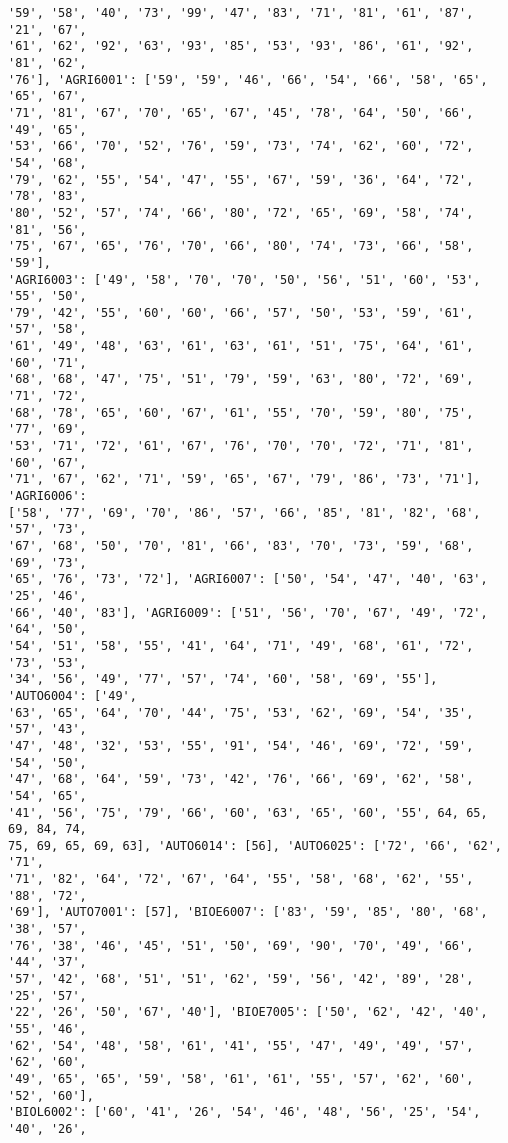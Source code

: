 \documentclass[11pt]{article}
\begin{document}
\begin{Verbatim}[commandchars=\\\{\}]
'59', '58', '40', '73', '99', '47', '83', '71', '81', '61', '87', '21', '67',
'61', '62', '92', '63', '93', '85', '53', '93', '86', '61', '92', '81', '62',
'76'], 'AGRI6001': ['59', '59', '46', '66', '54', '66', '58', '65', '65', '67',
'71', '81', '67', '70', '65', '67', '45', '78', '64', '50', '66', '49', '65',
'53', '66', '70', '52', '76', '59', '73', '74', '62', '60', '72', '54', '68',
'79', '62', '55', '54', '47', '55', '67', '59', '36', '64', '72', '78', '83',
'80', '52', '57', '74', '66', '80', '72', '65', '69', '58', '74', '81', '56',
'75', '67', '65', '76', '70', '66', '80', '74', '73', '66', '58', '59'],
'AGRI6003': ['49', '58', '70', '70', '50', '56', '51', '60', '53', '55', '50',
'79', '42', '55', '60', '60', '66', '57', '50', '53', '59', '61', '57', '58',
'61', '49', '48', '63', '61', '63', '61', '51', '75', '64', '61', '60', '71',
'68', '68', '47', '75', '51', '79', '59', '63', '80', '72', '69', '71', '72',
'68', '78', '65', '60', '67', '61', '55', '70', '59', '80', '75', '77', '69',
'53', '71', '72', '61', '67', '76', '70', '70', '72', '71', '81', '60', '67',
'71', '67', '62', '71', '59', '65', '67', '79', '86', '73', '71'], 'AGRI6006':
['58', '77', '69', '70', '86', '57', '66', '85', '81', '82', '68', '57', '73',
'67', '68', '50', '70', '81', '66', '83', '70', '73', '59', '68', '69', '73',
'65', '76', '73', '72'], 'AGRI6007': ['50', '54', '47', '40', '63', '25', '46',
'66', '40', '83'], 'AGRI6009': ['51', '56', '70', '67', '49', '72', '64', '50',
'54', '51', '58', '55', '41', '64', '71', '49', '68', '61', '72', '73', '53',
'34', '56', '49', '77', '57', '74', '60', '58', '69', '55'], 'AUTO6004': ['49',
'63', '65', '64', '70', '44', '75', '53', '62', '69', '54', '35', '57', '43',
'47', '48', '32', '53', '55', '91', '54', '46', '69', '72', '59', '54', '50',
'47', '68', '64', '59', '73', '42', '76', '66', '69', '62', '58', '54', '65',
'41', '56', '75', '79', '66', '60', '63', '65', '60', '55', 64, 65, 69, 84, 74,
75, 69, 65, 69, 63], 'AUTO6014': [56], 'AUTO6025': ['72', '66', '62', '71',
'71', '82', '64', '72', '67', '64', '55', '58', '68', '62', '55', '88', '72',
'69'], 'AUTO7001': [57], 'BIOE6007': ['83', '59', '85', '80', '68', '38', '57',
'76', '38', '46', '45', '51', '50', '69', '90', '70', '49', '66', '44', '37',
'57', '42', '68', '51', '51', '62', '59', '56', '42', '89', '28', '25', '57',
'22', '26', '50', '67', '40'], 'BIOE7005': ['50', '62', '42', '40', '55', '46',
'62', '54', '48', '58', '61', '41', '55', '47', '49', '49', '57', '62', '60',
'49', '65', '65', '59', '58', '61', '61', '55', '57', '62', '60', '52', '60'],
'BIOL6002': ['60', '41', '26', '54', '46', '48', '56', '25', '54', '40', '26',

\end{Verbatim}
\end{document}
